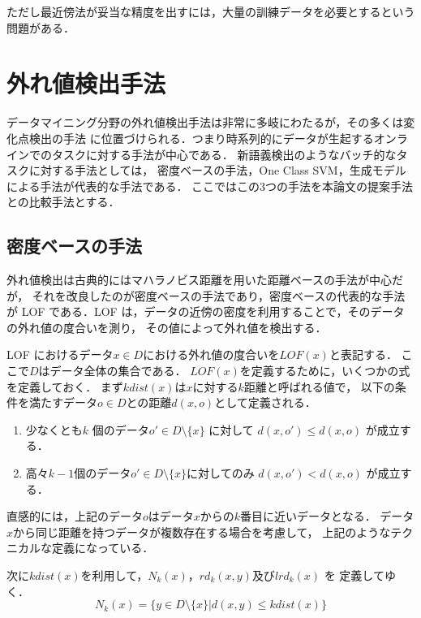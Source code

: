 \documentclass[japanese]{jnlp_1.4}
\begin{document}
ただし最近傍法が妥当な精度を出すには，大量の訓練データを必要とするという問題がある．


\section{外れ値検出手法}

データマイニング分野の外れ値検出手法は非常に多岐にわたるが，その多くは変化点検出の手法
に位置づけられる\cite{yamanishi}．つまり時系列的にデータが生起するオンラインでのタスクに対する手法が中心である．
新語義検出のようなバッチ的なタスクに対する手法としては，
密度ベースの手法，One Class SVM，生成モデルによる手法が代表的な手法である．
ここではこの3つの手法を本論文の提案手法との比較手法とする．



\subsection{密度ベースの手法}

外れ値検出は古典的にはマハラノビス距離を用いた距離ベースの手法が中心だが，
それを改良したのが密度ベースの手法であり，密度ベースの代表的な手法が
LOF である．LOF は，データの近傍の密度を利用することで，そのデータの外れ値の度合いを測り，
その値によって外れ値を検出する．

LOF におけるデータ\( x \in D\)における外れ値の度合いを\( LOF(x) \)と表記する．
ここで\( D \)はデータ全体の集合である．
\( LOF(x) \)を定義するために，いくつかの式を定義しておく．
まず\( kdist(x)\)は\( x \)に対する\( k \)距離と呼ばれる値で，
以下の条件を満たすデータ\( o \in D\)との距離\( d(x,o) \)として定義される．

\begin{enumerate}
\item 少なくとも\( k \) 個のデータ\(o' \in D\setminus\{x\}\) に対して \( d(x,o') \leq d(x,o)\) が成立する．
\item 高々\( k - 1 \)個のデータ\( o' \in D\setminus\{x\}\)に対してのみ \( d(x,o') < d(x,o)\) が成立する．
\end{enumerate}

直感的には，上記のデータ\( o \)はデータ\( x\)からの\( k\)番目に近いデータとなる．
データ\( x\)から同じ距離を持つデータが複数存在する場合を考慮して，
上記のようなテクニカルな定義になっている．

次に\( kdist(x) \)を利用して，\( N_{k}(x) \)，\( rd_{k}(x,y) \)及び\( lrd_{k}(x) \) を
定義してゆく．
\[
N_{k}(x) = \{ y \in D\setminus\{x\}| d(x,y) \leq kdist(x) \}
\]
\end{document}
